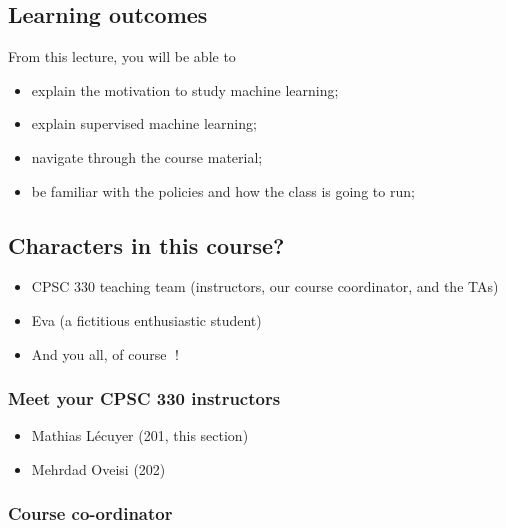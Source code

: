 \documentclass[11pt]{article}
\providecommand{\tightlist}{%
      \setlength{\itemsep}{0pt}\setlength{\parskip}{0pt}}
\begin{document}
    \subsection{Learning outcomes}\label{learning-outcomes}

From this lecture, you will be able to

\begin{itemize}
\tightlist
\item
  explain the motivation to study machine learning;
\item
  explain supervised machine learning;
\item
  navigate through the course material;
\item
  be familiar with the policies and how the class is going to run;
\end{itemize}

    

    \subsection{Characters in this course?}\label{characters-in-this-course}

\begin{itemize}
\tightlist
\item
  CPSC 330 teaching team (instructors, our course coordinator, and the
  TAs)
\item
  Eva (a fictitious enthusiastic student)
\item
  And you all, of course 🙂!
\end{itemize}

    \subsubsection{Meet your CPSC 330
instructors}\label{meet-your-cpsc-330-instructors}

\begin{itemize}
\tightlist
\item
  Mathias Lécuyer (201, this section)
\end{itemize}

\begin{itemize}
\tightlist
\item
  Mehrdad Oveisi (202)
\end{itemize}

    \subsubsection{Course co-ordinator}\label{course-co-ordinator}
\end{document}

